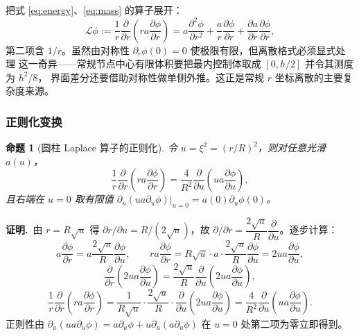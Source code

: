 \documentclass[bwprint]{cumcmthesis}
\newtheorem{proposition}{命题}
\begin{document}
把式 \eqref{eq:energy}、\eqref{eq:mass} 的算子展开：
\begin{equation}
\mathcal{L}\phi:=\frac{1}{r}\frac{\partial}{\partial r}\left(ra\frac{\partial\phi}{\partial r}\right)
=a\frac{\partial^2\phi}{\partial r^2}+\frac{a}{r}\frac{\partial\phi}{\partial r}
+\frac{\partial a}{\partial r}\frac{\partial\phi}{\partial r},
\end{equation}
第二项含 $1/r$。虽然由对称性 $\partial_r\phi(0)=0$ 使极限有限，但离散格式必须显式处理
这一奇异——常规节点中心有限体积要把最内控制体取成 $[0,h/2]$ 并令其测度为 $h^2/8$，
界面差分还要借助对称性做单侧外推。这正是常规 $r$ 坐标离散的主要复杂度来源。

\subsubsection{正则化变换}

\begin{proposition}[圆柱 Laplace 算子的正则化]
令 $u=\xi^2=(r/R)^2$，则对任意光滑 $a(u)$，
\begin{equation}
\frac{1}{r}\frac{\partial}{\partial r}\left(ra\frac{\partial\phi}{\partial r}\right)
=\frac{4}{R^2}\frac{\partial}{\partial u}\left(ua\frac{\partial\phi}{\partial u}\right),
\label{eq:reg}
\end{equation}
且右端在 $u=0$ 取有限值 $\partial_u(ua\partial_u\phi)|_{u=0}=a(0)\partial_u\phi(0)$。
\end{proposition}
\noindent\textbf{证明.}\ 
由 $r=R\sqrt u$ 得 $\partial r/\partial u=R/(2\sqrt u)$，故
$\partial/\partial r=\dfrac{2\sqrt u}{R}\dfrac{\partial}{\partial u}$。逐步计算：
\[
a\frac{\partial\phi}{\partial r}=a\frac{2\sqrt u}{R}\frac{\partial\phi}{\partial u},
\qquad
ra\frac{\partial\phi}{\partial r}=R\sqrt u\cdot a\cdot\frac{2\sqrt u}{R}\frac{\partial\phi}{\partial u}
=2ua\frac{\partial\phi}{\partial u},
\]
\[
\frac{\partial}{\partial r}\left(2ua\frac{\partial\phi}{\partial u}\right)
=\frac{2\sqrt u}{R}\frac{\partial}{\partial u}\left(2ua\frac{\partial\phi}{\partial u}\right),
\]
\[
\frac{1}{r}\frac{\partial}{\partial r}\left(ra\frac{\partial\phi}{\partial r}\right)
=\frac{1}{R\sqrt u}\cdot\frac{2\sqrt u}{R}\cdot
\frac{\partial}{\partial u}\left(2ua\frac{\partial\phi}{\partial u}\right)
=\frac{4}{R^2}\frac{\partial}{\partial u}\left(ua\frac{\partial\phi}{\partial u}\right).
\]
正则性由 $\partial_u(ua\partial_u\phi)=a\partial_u\phi+u\partial_u(a\partial_u\phi)$
在 $u=0$ 处第二项为零立即得到。
\end{document}
